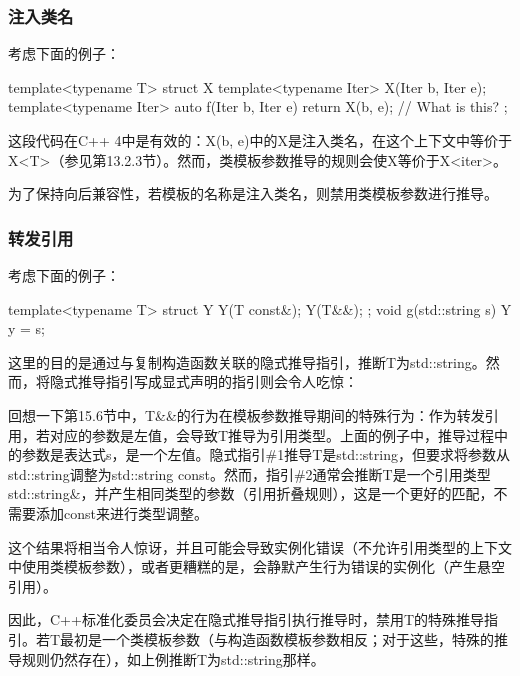 \subsubsection{注入类名}

考虑下面的例子：

\begin{cpp}
template<typename T> struct X {
	template<typename Iter> X(Iter b, Iter e);
	template<typename Iter> auto f(Iter b, Iter e) {
		return X(b, e); // What is this?
	}
};
\end{cpp}

这段代码在C++ 4中是有效的：X(b, e)中的X是注入类名，在这个上下文中等价于X<T>（参见第13.2.3节）。然而，类模板参数推导的规则会使X等价于X<iter>。

为了保持向后兼容性，若模板的名称是注入类名，则禁用类模板参数进行推导。


\subsubsection{转发引用}

考虑下面的例子：

\begin{cpp}
template<typename T> struct Y {
	Y(T const&);
	Y(T&&);
};
void g(std::string s) {
	Y y = s;
}
\end{cpp}

这里的目的是通过与复制构造函数关联的隐式推导指引，推断T为std::string。然而，将隐式推导指引写成显式声明的指引则会令人吃惊：


回想一下第15.6节中，T\&\&的行为在模板参数推导期间的特殊行为：作为转发引用，若对应的参数是左值，会导致T推导为引用类型。上面的例子中，推导过程中的参数是表达式s，是一个左值。隐式指引\#1推导T是std::string，但要求将参数从std::string调整为std::string const。然而，指引\#2通常会推断T是一个引用类型std::string\&，并产生相同类型的参数（引用折叠规则），这是一个更好的匹配，不需要添加const来进行类型调整。

这个结果将相当令人惊讶，并且可能会导致实例化错误（不允许引用类型的上下文中使用类模板参数），或者更糟糕的是，会静默产生行为错误的实例化（产生悬空引用）。

因此，C++标准化委员会决定在隐式推导指引执行推导时，禁用T的特殊推导指引。若T最初是一个类模板参数（与构造函数模板参数相反；对于这些，特殊的推导规则仍然存在），如上例推断T为std::string那样。

